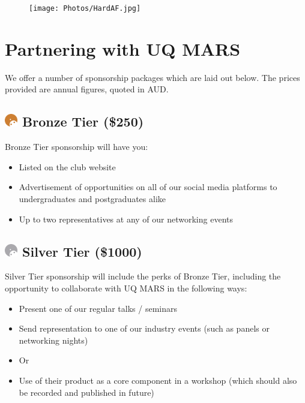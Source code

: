 \documentclass[a4paper,12pt]{report}
\begin{document}
\begin{figure}[H]
    \centering
    \texttt{[image: Photos/HardAF.jpg]}
\end{figure}

\newpage

\section*{Partnering with UQ MARS}
\large
We offer a number of sponsorship packages which are laid out below. The prices provided are annual figures, quoted in AUD.
\normalsize

\subsection*{
    \includegraphics[width=1em]{../assets/Sponsor Icons/Bronze.png}
    \textcolor{sponsor_bronze}{Bronze Tier (\$250)}
}
Bronze Tier sponsorship will have you:
\begin{itemize}
    \item Listed on the club website
    \item Advertisement of opportunities on all of our social media platforms to undergraduates and postgraduates alike
    \item Up to two representatives at any of our networking events
\end{itemize}

\subsection*{
    \includegraphics[width=1em]{../assets/Sponsor Icons/Silver.png}
    \textcolor{sponsor_silver}{Silver Tier (\$1000)}
}
Silver Tier sponsorship will include the perks of Bronze Tier, including the opportunity to collaborate with UQ MARS in the following ways:
\begin{itemize}
    \item Present one of our regular talks / seminars
    \item Send representation to one of our industry events (such as panels or networking nights)
    \item Or
    \item Use of their product as a core component in a workshop (which should also be recorded and published in future)
\end{itemize}
\end{document}
